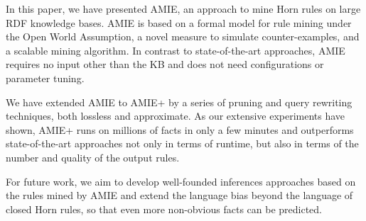 
In this paper, we have presented AMIE, an approach to mine Horn rules on large RDF knowledge bases. AMIE is based on a formal model for rule mining under the Open World Assumption, a novel measure to simulate counter-examples, and a scalable mining algorithm. In contrast to state-of-the-art approaches, AMIE requires no input other than the KB and does not need configurations or parameter tuning.

We have extended AMIE to AMIE+ by a series of pruning and query rewriting techniques, both lossless and approximate.
As our extensive experiments have shown, AMIE+ runs on millions of facts in only a few minutes and outperforms state-of-the-art approaches not only in terms of runtime,
but also in terms of the number and quality of the output rules.

For future work, we aim to develop well-founded inferences approaches based on the rules mined by AMIE and 
extend the language bias beyond the language of closed Horn rules,
so that even more non-obvious facts can be predicted.

